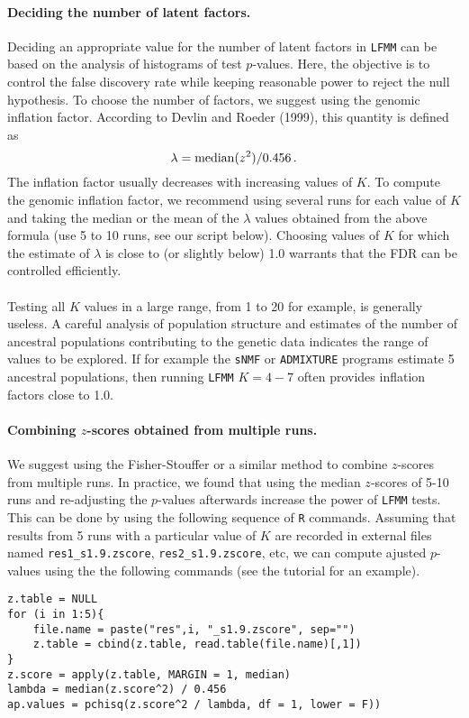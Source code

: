 \documentclass[10pt,a4paper]{article}
\begin{document}
\paragraph{Deciding the number of latent factors.} Deciding an appropriate value for the number of latent factors in {\tt LFMM} can be based on the analysis of histograms of test $p$-values. Here, the objective is to control the false discovery rate while keeping reasonable power to reject the null hypothesis.  To choose the number of factors, we suggest using the genomic inflation factor. According to Devlin and Roeder (1999), this quantity is defined  as 
$$
\lambda = {\rm median}( z^2 ) /0.456 \, . 
$$
The inflation factor usually decreases with increasing values of $K$. To compute the genomic inflation factor, we recommend using several runs for each value of $K$ and taking the median or the mean of the  $\lambda$ values obtained from the above formula (use 5 to 10 runs, see our script below).  Choosing values of $K$ for which the estimate of $\lambda$ is close to (or slightly below) 1.0 warrants that the FDR can be controlled efficiently.\\
\\
\noindent
Testing all $K$ values in a large range, from 1 to 20 for example,  is generally useless. A careful analysis of population structure and estimates of the number of ancestral populations contributing to the genetic data indicates the range of values to be explored. If for example the {\tt sNMF} or {\tt ADMIXTURE} programs estimate 5 ancestral populations, then running {\tt LFMM} $K = 4-7$ often provides inflation factors close to 1.0.  

\paragraph{Combining $z$-scores obtained from multiple runs.}  We suggest using the Fisher-Stouffer or a similar method to combine $z$-scores from multiple runs. In practice, we found that using the median $z$-scores of 5-10 runs and re-adjusting the $p$-values afterwards increase the power of {\tt LFMM} tests. This can be done by using the following sequence of {\tt R} commands. Assuming that results from 5 runs with a particular value of $K$ are recorded in external files named {\tt res1\_s1.9.zscore}, {\tt res2\_s1.9.zscore}, etc, we can compute ajusted $p$-values using the the following commands (see the tutorial for an example). 
\begin{Verbatim} 
z.table = NULL
for (i in 1:5){ 
	file.name = paste("res",i, "_s1.9.zscore", sep="")
	z.table = cbind(z.table, read.table(file.name)[,1])
}
z.score = apply(z.table, MARGIN = 1, median)
lambda = median(z.score^2) / 0.456
ap.values = pchisq(z.score^2 / lambda, df = 1, lower = F))
\end{Verbatim} 
                        
\end{document}
